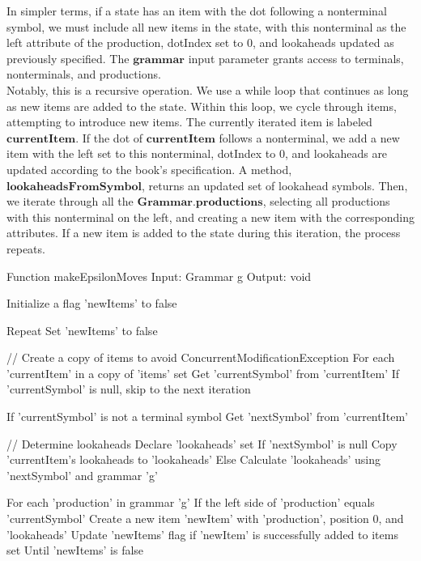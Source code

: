 In simpler terms, if a state has an item with the dot following a nonterminal symbol, we must include all new items in the state, with this nonterminal as the left attribute of the production, dotIndex set to 0, and lookaheads updated as previously specified. The \(\boldsymbol{grammar}\) input parameter grants access to terminals, nonterminals, and productions.\\

Notably, this is a recursive operation. We use a while loop that continues as long as new items are added to the state. Within this loop, we cycle through items, attempting to introduce new items. The currently iterated item is labeled  \(\boldsymbol{currentItem}\). If the dot of \(\boldsymbol{currentItem}\) follows a nonterminal, we add a new item with the left set to this nonterminal, dotIndex to 0, and lookaheads are updated according to the book's specification. A method, \(\boldsymbol{lookaheadsFromSymbol}\), returns an updated set of lookahead symbols. Then, we iterate through all the \(\boldsymbol{Grammar.productions}\), selecting all productions with this nonterminal on the left, and creating a new item with the corresponding attributes. If a new item is added to the state during this iteration, the process repeats.\\

\begin{codeblock}
    Function makeEpsilonMoves
    Input: Grammar g
    Output: void

    Initialize a flag 'newItems' to false

    Repeat
    Set 'newItems' to false

    // Create a copy of items to avoid ConcurrentModificationException
    For each 'currentItem' in a copy of 'items' set
    Get 'currentSymbol' from 'currentItem'
    If 'currentSymbol' is null, skip to the next iteration

    If 'currentSymbol' is not a terminal symbol
    Get 'nextSymbol' from 'currentItem'

    // Determine lookaheads
    Declare 'lookaheads' set
    If 'nextSymbol' is null
    Copy 'currentItem's lookaheads to 'lookaheads'
    Else
    Calculate 'lookaheads' using 'nextSymbol' and grammar 'g'

    For each 'production' in grammar 'g'
    If the left side of 'production' equals 'currentSymbol'
    Create a new item 'newItem' with 'production', position 0, and 'lookaheads'
    Update 'newItems' flag if 'newItem' is successfully added to items set
    Until 'newItems' is false
\end{codeblock}

